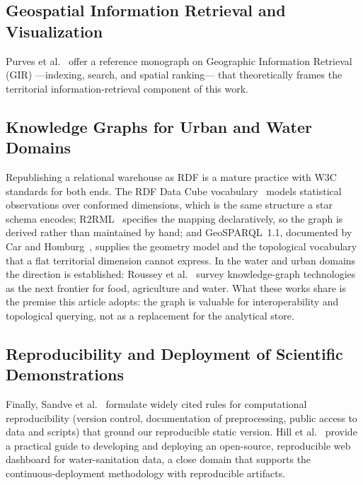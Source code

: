 \documentclass[runningheads]{llncs}
\newif\ifmarcarcambios
\newenvironment{icokgblock}{\ifmarcarcambios\color{nuevo}\fi}{}
\renewcommand{\_}{\origunderscore\allowbreak}
\begin{document}
\subsection{Geospatial Information Retrieval and Visualization}

Purves et al.~\cite{purves2018} offer a reference monograph on Geographic Information Retrieval (GIR) ---indexing, search, and spatial ranking--- that theoretically frames the territorial information-retrieval component of this work.

\begin{icokgblock}
\subsection{Knowledge Graphs for Urban and Water Domains}

Republishing a relational warehouse as RDF is a mature practice with W3C
standards for both ends. The RDF Data Cube vocabulary~\cite{datacube} models
statistical observations over conformed dimensions, which is the same structure a
star schema encodes; R2RML~\cite{r2rml} specifies the mapping declaratively, so
the graph is derived rather than maintained by hand; and GeoSPARQL~1.1, documented by Car and
Homburg~\cite{carhomburg2022}, supplies the geometry model and the topological
vocabulary that a flat territorial dimension cannot express. In the
water and urban domains the direction is established: Roussey et
al.~\cite{roussey2023} survey knowledge-graph technologies as the next frontier
for food, agriculture and water. What these works share is the premise this
article adopts: the graph is valuable for interoperability and topological
querying, not as a replacement for the analytical store.
\end{icokgblock}

\subsection{Reproducibility and Deployment of Scientific Demonstrations}

Finally, Sandve et al.~\cite{sandve2013} formulate widely cited rules for computational reproducibility (version control, documentation of preprocessing, public access to data and scripts) that ground our reproducible static version. Hill et al.~\cite{hill2023} provide a practical guide to developing and deploying an open-source, reproducible web dashboard for water-sanitation data, a close domain that supports the continuous-deployment methodology with reproducible artifacts.
\end{document}
